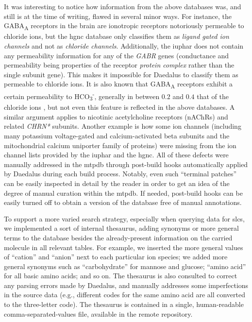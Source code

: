 It was interesting to notice how information from the above databases was, and
still is at the time of writing, flawed in several minor ways. For instance, the
GABA\textsubscript{A} receptors in the brain are ionotropic receptors notoriously permeable to chloride ions, but
the \gls{hgnc} database only classifies them as \textit{ligand gated ion channels} and not as \textit{chloride channels}.
Additionally, the \gls{iuphar} does not contain any permeability information for
any of the \textit{GABR\textasteriskcentered{}} genes (conductance and permeability being properties of the receptor \textit{protein complex} rather than the single subunit gene). This makes it impossible for Daedalus to classify them as permeable
to chloride ions.
It is also known that GABA\textsubscript{A} receptors exhibit a certain
permeability to HCO\textsubscript{3}\textsuperscript{-}, generally in between $0.2$ and $0.4$
that of the chloride ions \cite{goetzGABAAReceptors2007}, but not even this feature is reflected in the above databases.
A similar argument applies to nicotinic acetylcholine receptors (nAChRs) and related \textit{CHRN*} subunits.
Another example is how some ion channels (including many potassium voltage-gated and calcium-activated beta subunits and the mitochondrial calcium
uniporter family of proteins) were missing from the ion channel lists provided
by the \gls{iuphar} and the \gls{hgnc}.
All of these defects were manually addressed in the \gls{mtpdb} through
post-build hooks automatically applied by Daedalus during each build process.
Notably, even such ``terminal patches'' can be easily inspected in detail by the
reader in order to get an idea of the degree of manual curation within the
\gls{mtpdb}. If needed, post-build hooks can be easily turned off to obtain a
version of the database free of manual annotations.

To support a more varied search strategy, especially when querying data for
\glspl{slc}, we implemented a sort of internal thesaurus, adding synonyms or
more general terms to the database besides the already-present information on the
carried molecule in all relevant tables. For example, we inserted the more
general values of ``cation'' and ``anion'' next to each particular ion species; we
added more general synonyms such as ``carbohydrate'' for mannose and glucose;
``amino acid'' for all basic amino acids; and so on.
The thesaurus is also consulted to correct any parsing errors made by Daedalus, and manually addresses some imperfections in the source data (e.g., different codes for the same amino acid are all converted to the three-letter code).
The thesaurus is contained in a single, human-readable comma-separated-values file, available in the remote repository.


